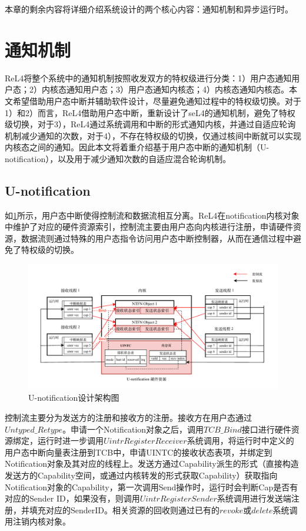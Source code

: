 本章的剩余内容将详细介绍系统设计的两个核心内容：通知机制和异步运行时。
\section{通知机制}

ReL4将整个系统中的通知机制按照收发双方的特权级进行分类：1）用户态通知用户态；2）内核态通知用户态；3）用户态通知内核态；4）内核态通知内核态。本文希望借助用户态中断并辅助软件设计，尽量避免通知过程中的特权级切换。对于1）和2）而言，ReL4借助用户态中断，重新设计了seL4的通知机制，避免了特权级切换，对于3），ReL4通过系统调用和中断的形式通知内核，并通过自适应轮询机制减少通知的次数，对于4），不存在特权级的切换，仅通过核间中断就可以实现内核态之间的通知。因此本文将着重介绍基于用户态中断的通知机制（U-notification），以及用于减少通知次数的自适应混合轮询机制。

\subsection{U-notification}
如\ref{fig:u-notification}所示，用户态中断使得控制流和数据流相互分离。ReL4在notification内核对象中维护了对应的硬件资源索引，控制流主要由用户态向内核进行注册，申请硬件资源，数据流则通过特殊的用户态指令访问用户态中断控制器，从而在通信过程中避免了特权级的切换。

\begin{figure}[htbp]
  \centering
  \includegraphics[width=1.0\textwidth]{figures/uintr_for_ntfn.pdf}
  \caption{U-notification设计架构图}\label{fig:u-notification}
\end{figure}

控制流主要分为发送方的注册和接收方的注册。接收方在用户态通过$Untyped\_Retype$。申请一个Notification对象之后，调用$TCB\_Bind$接口进行硬件资源绑定，运行时进一步调用$UintrRegisterReceiver$系统调用，将运行时中定义的用户态中断向量表注册到TCB中，申请UINTC的接收状态表项，并绑定到Notification对象及其对应的线程上。发送方通过Capability派生的形式（直接构造发送方的Capability空间，或通过内核转发的形式获取Capability）获取指向Notification对象的Capability，第一次调用Send操作时，运行时会判断Cap是否有对应的Sender ID，如果没有，则调用$UintrRegisterSender$系统调用进行发送端注册，并填充对应的SenderID。相关资源的回收则通过已有的$revoke$或$delete$系统调用注销内核对象。

